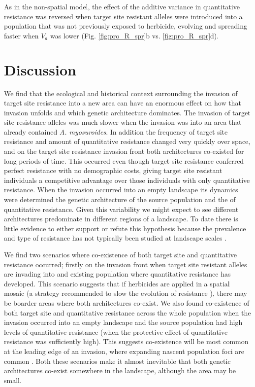 \documentclass[10pt,letterpaper]{article}
\begin{document}
As in the non-spatial model, the effect of the additive variance in quantitative resistance was reversed when target site resistant alleles were introduced into a population that was not previously exposed to herbicide, evolving and spreading faster when $V_a$ was lower (Fig. \ref{fig:pro_R_spr}b vs. \ref{fig:pro_R_spr}d).             

\section*{Discussion}
We find that the ecological and historical context surrounding the invasion of target site resistance into a new area can have an enormous effect on how that invasion unfolds and which genetic architecture dominates. The invasion of target site resistance alleles was much slower when the invasion was into an area that already contained \textit{A. myosuroides}. In addition the frequency of target site resistance and amount of quantitative resistance changed very quickly over space, and on the target site resistance invasion front both architectures co-existed for long periods of time. This occurred even though target site resistance conferred perfect resistance with no demographic costs, giving target site resistant individuals a competitive advantage over those individuals with only quantitative resistance. When the invasion occurred into an empty landscape its dynamics were determined the genetic architecture of the source population and the of quantitative resistance. Given this variability we might expect to see different architectures predominate in different regions of a landscape. To date there is little evidence to either support or refute this hypothesis because the prevalence and type of resistance has not typically been studied at landscape scales \cite{Dely2013}.

We find two scenarios where co-existence of both target site and quantitative resistance occurred; firstly on the invasion front when target site resistant alleles are invading into and existing population where quantitative resistance has developed. This scenario suggests that if herbicides are applied in a spatial mosaic (a strategy recommended to slow the evolution of resistance \cite{Rex2013}), there may be boarder areas where both architectures co-exist. We also found co-existence of both target site and quantitative resistance across the whole population when the invasion occurred into an empty landscape and the source population had high levels of quantitative resistance (when the protective effect of quantitative resistance was sufficiently high). This suggests co-existence will be most common at the leading edge of an invasion, where expanding nascent population foci are common \cite{Mooy1988}. Both these scenarios make it almost inevitable that both genetic architectures co-exist somewhere in the landscape, although the area may be small.
\end{document}
